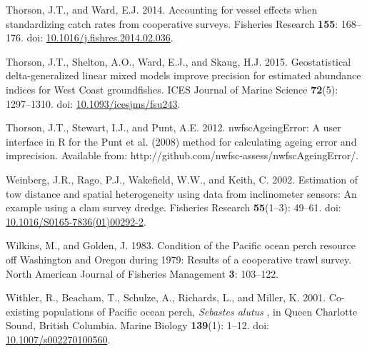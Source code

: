 \documentclass[12pt,]{article}
\begin{document}
\hypertarget{ref-thorson_accounting_2014}{}
Thorson, J.T., and Ward, E.J. 2014. Accounting for vessel effects when
standardizing catch rates from cooperative surveys. Fisheries Research
\textbf{155}: 168--176. doi:
\href{https://doi.org/10.1016/j.fishres.2014.02.036}{10.1016/j.fishres.2014.02.036}.

\hypertarget{ref-thorson_geostatistical_2015}{}
Thorson, J.T., Shelton, A.O., Ward, E.J., and Skaug, H.J. 2015.
Geostatistical delta-generalized linear mixed models improve precision
for estimated abundance indices for West Coast groundfishes. ICES
Journal of Marine Science \textbf{72}(5): 1297--1310. doi:
\href{https://doi.org/10.1093/icesjms/fsu243}{10.1093/icesjms/fsu243}.

\hypertarget{ref-thorson_nwfscageingerror:_2012}{}
Thorson, J.T., Stewart, I.J., and Punt, A.E. 2012. nwfscAgeingError: A
user interface in R for the Punt et al. (2008) method for calculating
ageing error and imprecision. Available from:
http://github.com/nwfsc-assess/nwfscAgeingError/.

\hypertarget{ref-weinberg_estimation_2002}{}
Weinberg, J.R., Rago, P.J., Wakefield, W.W., and Keith, C. 2002.
Estimation of tow distance and spatial heterogeneity using data from
inclinometer sensors: An example using a clam survey dredge. Fisheries
Research \textbf{55}(1--3): 49--61. doi:
\href{https://doi.org/10.1016/S0165-7836(01)00292-2}{10.1016/S0165-7836(01)00292-2}.

\hypertarget{ref-wilkins_condition_1983}{}
Wilkins, M., and Golden, J. 1983. Condition of the Pacific ocean perch
resource off Washington and Oregon during 1979: Results of a cooperative
trawl survey. North American Journal of Fisheries Management \textbf{3}:
103--122.

\hypertarget{ref-withler_co-existing_2001}{}
Withler, R., Beacham, T., Schulze, A., Richards, L., and Miller, K.
2001. Co-existing populations of Pacific ocean perch, \emph{Sebastes
alutus} , in Queen Charlotte Sound, British Columbia. Marine Biology
\textbf{139}(1): 1--12. doi:
\href{https://doi.org/10.1007/s002270100560}{10.1007/s002270100560}.
\end{document}
